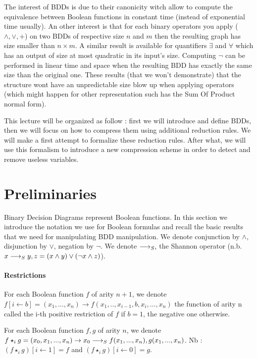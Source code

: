 \documentclass[a4paper,10pt]{article}
\begin{document}
The interest of BDDs is due to their canonicity witch allow to compute the equivalence between Boolean functions in constant time (instead of exponential time usually).
An other interest is that for each binary operators you apply ($\land, \lor, +$) on two BDDs of respective size $n$ and $m$ then the resulting graph has size smaller than $n\times m$.
A similar result is available for quantifiers $\exists$ and $\forall$ which has an output of size at most quadratic in its input's size.
Computing $\lnot$ can be performed in linear time and space when the resulting BDD has exactly the same size than the original one.
These results (that we won't demonstrate) that the structure wont have an unpredictable size blow up when applying operators (which might happen for other representation such has the Sum Of Product normal form).


This lecture will be organized as follow : first we will introduce and define BDDs, then we will focus on how to compress them using additional reduction rules.
We will make a first attempt to formalize these reduction rules.
After what, we will use this formalism to introduce a new compression scheme in order to detect and remove useless variables.

\section{Preliminaries}

Binary Decision Diagrams represent Boolean functions. In this section we introduce the notation we use for Boolean formulas and recall the basic results that we need for manipulating BDD manipulation.  We denote conjunction by $\land$, disjunction by $\lor$, negation by $\lnot$. We denote $\longrightarrow_S ,$ the Shannon operator (n.b. $x \longrightarrow_S y, z = (x \land y) \lor (\lnot x \land z)$).

\paragraph{Restrictions\\}

For each Boolean function $f$ of arity $n+1$, we denote $f[i\leftarrow b] = (x_1, ..., x_n) \rightarrow f(x_1, .., x_{i-1}, b, x_i, ..., x_n)$ the function of arity n called the i-th positive restriction of $f$ if $b=1$, the negative one otherwise.


For each Boolean function $f, g$ of arity $n$, we denote $f\star_i g  = (x_0, x_1, ..., x_n) \rightarrow x_0 \longrightarrow_S f(x_1, ..., x_n), g(x_1, ..., x_n)$. Nb : $ (f\star_i g)[i\leftarrow 1] = f$ and $ (f\star_i g)[i\leftarrow 0] = g$.
\end{document}
